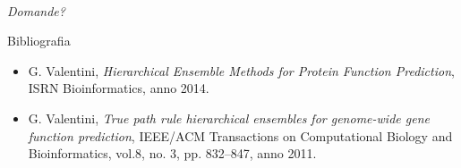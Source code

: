 \documentclass[9pt]{beamer}
\begin{document}
\begin{frame}{}
  \centering \Large
  \emph{\\Domande?}
\end{frame}
\begin{tframe}{Bibliografia}
\begin{itemize}
\item G. Valentini,\emph{ Hierarchical Ensemble Methods for Protein Function Prediction}, ISRN Bioinformatics, anno 2014.
\item G. Valentini, \emph{True path rule hierarchical ensembles for genome-wide gene function prediction}, IEEE/ACM Transactions on Computational Biology and Bioinformatics, vol.8, no. 3, pp. 832–847, anno 2011.
\end{itemize}
\end{tframe}
\end{document}
